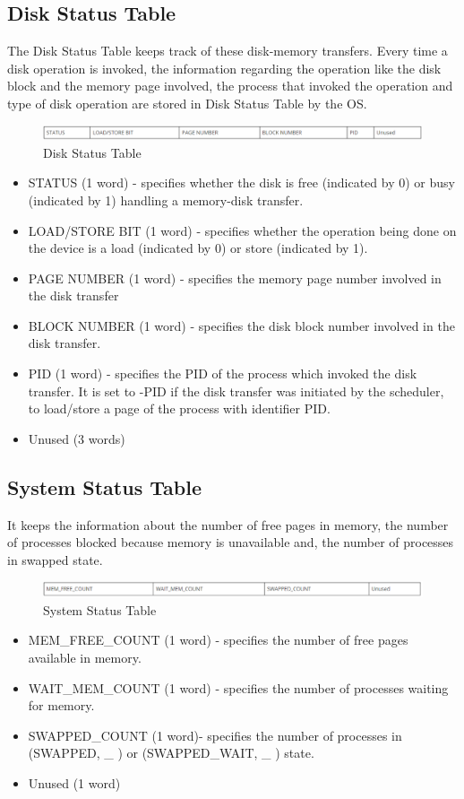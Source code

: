 \subsection {Disk Status Table}
The Disk Status Table keeps track of these disk-memory transfers. Every time a disk operation is invoked, the information regarding the operation like the disk block and the memory page involved, the process that invoked the operation and type of disk operation are stored in Disk Status Table by the OS.
\begin{figure}[ht]
\centering
\includegraphics  [scale=0.55]{figures/ds.png}
\caption{\footnotesize Disk Status Table}
\end{figure}
\begin {itemize}

\item STATUS (1 word) - specifies whether the disk is free (indicated by 0) or busy (indicated by 1) handling a memory-disk transfer.
\item LOAD/STORE BIT (1 word) - specifies whether the operation being done on the device is a load (indicated by 0) or store (indicated by 1).
\item PAGE NUMBER (1 word) - specifies the memory page number involved in the disk transfer
\item BLOCK NUMBER (1 word) - specifies the disk block number involved in the disk transfer.
\item PID (1 word) - specifies the PID of the process which invoked the disk transfer. It is set to -PID if the disk transfer was initiated by the scheduler, to load/store a page of the process with identifier PID.
\item Unused (3 words)

\end {itemize}

\subsection {System Status Table}
It keeps the information about the number of free pages in memory, the number of processes blocked because memory is unavailable and, the number of processes in swapped state. 
\begin{figure}[ht]
\centering
\includegraphics  [scale=0.55]{figures/sst.png}
\caption{\footnotesize System Status Table}
\end{figure}
\begin {itemize}
\item MEM\_FREE\_COUNT (1 word) - specifies the number of free pages available in memory.
\item WAIT\_MEM\_COUNT (1 word) - specifies the number of processes waiting for memory.
\item SWAPPED\_COUNT (1 word)- specifies the number of processes in (SWAPPED, \_ ) or (SWAPPED\_WAIT, \_ ) state.
\item Unused (1 word)
\end {itemize}

